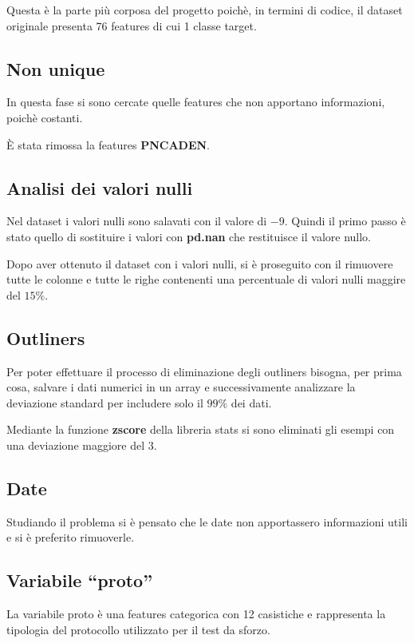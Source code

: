 \documentclass[a4paper]{article}
\begin{document}
    Questa è la parte più corposa del progetto poichè, in termini di codice, il dataset originale presenta 76 features di cui 1 classe target.


    \subsection{Non unique}
    In questa fase si sono cercate quelle features che non apportano informazioni, poichè costanti.

    È stata rimossa la features \textbf{PNCADEN}.

    \subsection{Analisi dei valori nulli}
    Nel dataset i valori nulli sono salavati con il valore di \textbf{$-9$}.
    Quindi il primo passo è stato quello di sostituire i valori con \textbf{pd.nan} che restituisce il valore nullo.

    Dopo aver ottenuto il dataset con i valori nulli, si è proseguito con il rimuovere tutte le colonne e tutte le righe
    contenenti una percentuale di valori nulli maggire del $15\%$.

    \subsection{Outliners}
    Per poter effettuare il processo di eliminazione degli outliners bisogna, per prima cosa, salvare i dati numerici in un
    array e successivamente analizzare la deviazione standard per includere solo il $99\%$ dei dati.

    Mediante la funzione \textbf{zscore} della libreria stats si sono eliminati gli esempi con una deviazione maggiore del 3.

    \subsection{Date}
    Studiando il problema si è pensato che le date non apportassero informazioni utili e si è preferito rimuoverle.
    

    \subsection{Variabile ``proto''}
    La variabile proto è una features categorica con 12 casistiche e rappresenta la tipologia del protocollo utilizzato 
    per il test da sforzo.
\end{document}

